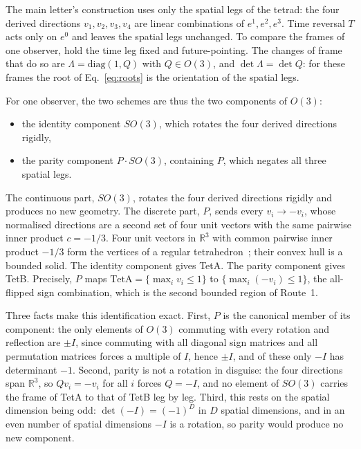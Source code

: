 \documentclass[twocolumn]{iopjournal}
\begin{document}
The main letter's construction uses only the spatial legs of the tetrad: the four derived directions $v_1, v_2, v_3, v_4$ are linear combinations of $e^1, e^2, e^3$. Time reversal $T$ acts only on $e^0$ and leaves the spatial legs unchanged. To compare the frames of one observer, hold the time leg fixed and future-pointing. The changes of frame that do so are $\Lambda = \mathrm{diag}(1, Q)$ with $Q \in O(3)$, and $\det \Lambda = \det Q$: for these frames the root of Eq.~\eqref{eq:roots} is the orientation of the spatial legs.

For one observer, the two schemes are thus the two components of $O(3)$:
\begin{itemize}
\item the identity component $SO(3)$, which rotates the four derived directions rigidly,
\item the parity component $P \cdot SO(3)$, containing $P$, which negates all three spatial legs.
\end{itemize}

The continuous part, $SO(3)$, rotates the four derived directions rigidly and produces no new geometry. The discrete part, $P$, sends every $v_i \to -v_i$, whose normalised directions are a second set of four unit vectors with the same pairwise inner product $c = -1/3$. Four unit vectors in $\mathbb{R}^3$ with common pairwise inner product $-1/3$ form the vertices of a regular tetrahedron~\cite{Coxeter1973}; their convex hull is a bounded solid. The identity component gives TetA. The parity component gives TetB. Precisely, $P$ maps $\mathrm{TetA} = \{\max_i v_i \le 1\}$ to $\{\max_i (-v_i) \le 1\}$, the all-flipped sign combination, which is the second bounded region of Route~1.

Three facts make this identification exact. First, $P$ is the canonical member of its component: the only elements of $O(3)$ commuting with every rotation and reflection are $\pm I$, since commuting with all diagonal sign matrices and all permutation matrices forces a multiple of $I$, hence $\pm I$, and of these only $-I$ has determinant $-1$. Second, parity is not a rotation in disguise: the four directions span $\mathbb{R}^3$, so $Q v_i = -v_i$ for all $i$ forces $Q = -I$, and no element of $SO(3)$ carries the frame of TetA to that of TetB leg by leg. Third, this rests on the spatial dimension being odd: $\det(-I) = (-1)^D$ in $D$ spatial dimensions, and in an even number of spatial dimensions $-I$ is a rotation, so parity would produce no new component.
\end{document}
